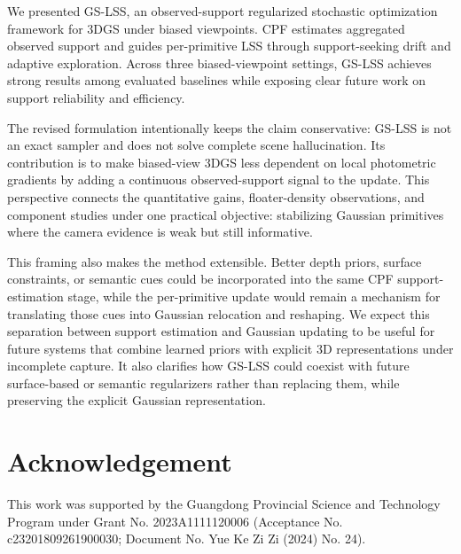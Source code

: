 \documentclass[lettersize,journal]{IEEEtran}
\begin{document}
We presented GS-LSS, an observed-support regularized stochastic optimization framework for 3DGS under biased viewpoints. CPF estimates aggregated observed support and guides per-primitive LSS through support-seeking drift and adaptive exploration. Across three biased-viewpoint settings, GS-LSS achieves strong results among evaluated baselines while exposing clear future work on support reliability and efficiency.

The revised formulation intentionally keeps the claim conservative: GS-LSS is not an exact sampler and does not solve complete scene hallucination. Its contribution is to make biased-view 3DGS less dependent on local photometric gradients by adding a continuous observed-support signal to the update. This perspective connects the quantitative gains, floater-density observations, and component studies under one practical objective: stabilizing Gaussian primitives where the camera evidence is weak but still informative.

This framing also makes the method extensible. Better depth priors, surface constraints, or semantic cues could be incorporated into the same CPF support-estimation stage, while the per-primitive update would remain a mechanism for translating those cues into Gaussian relocation and reshaping. We expect this separation between support estimation and Gaussian updating to be useful for future systems that combine learned priors with explicit 3D representations under incomplete capture. It also clarifies how GS-LSS could coexist with future surface-based or semantic regularizers rather than replacing them, while preserving the explicit Gaussian representation.

\section*{Acknowledgement}
This work was supported by the Guangdong Provincial Science and Technology Program under Grant No. 2023A1111120006 (Acceptance No. c23201809261900030; Document No. Yue Ke Zi Zi (2024) No. 24).




\vfill
\end{document}
